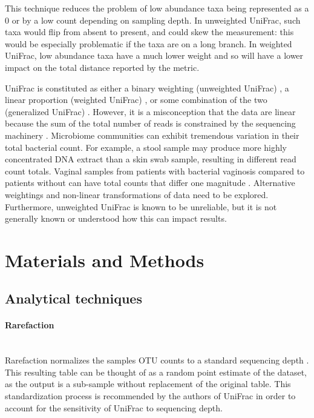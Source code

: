 \documentclass[10pt,letterpaper]{article}
\begin{document}
This technique reduces the problem of low abundance taxa being represented as a 0 or by a low count depending on sampling depth. In unweighted UniFrac, such taxa would flip from absent to present, and could skew the measurement: this would be especially problematic if the taxa are on a long branch. In weighted UniFrac, low abundance taxa have a much lower weight and so will have a lower impact on the total distance reported by the metric.

UniFrac is constituted as either a binary weighting (unweighted UniFrac) \cite{lozupone2005unifrac}, a linear proportion (weighted UniFrac) \cite{lozupone2007quantitative}, or some combination of the two (generalized UniFrac) \cite{chen2012associating}. However, it is a misconception that the data are linear because the sum of the total number of reads is constrained by the sequencing machinery \cite{friedman2012inferring} \cite{fernandes2013anova} \cite{fernandes2014unifying} \cite{lovell2015proportionality}. Microbiome communities can exhibit tremendous variation in their total bacterial count. For example, a stool sample may produce more highly concentrated DNA extract than a skin swab sample, resulting in different read count totals. Vaginal samples from patients with bacterial vaginosis compared to patients without can have total counts that differ one magnitude \cite{zozaya2010quantitative}. Alternative weightings and non-linear transformations of data need to be explored. Furthermore, unweighted UniFrac is known to be unreliable, but it is not generally known or understood how this can impact results.

\section*{Materials and Methods}

\subsection{Analytical techniques}

\paragraph{Rarefaction}\mbox{}\\
Rarefaction normalizes the samples OTU counts to a standard sequencing depth \cite{simberloff1978use}. This resulting table can be thought of as a random point estimate of the dataset, as the output is a sub-sample without replacement of the original table. This standardization process is recommended by the authors of UniFrac \cite{de2011evaluation} in order to account for the sensitivity of UniFrac to sequencing depth.
\end{document}
